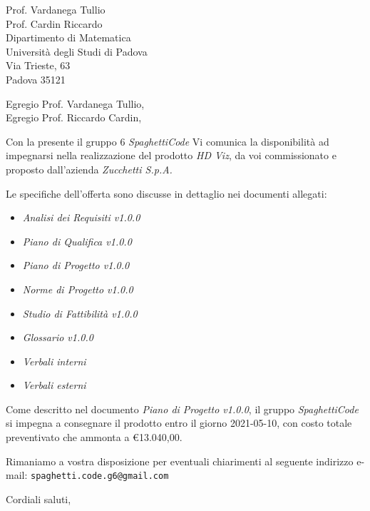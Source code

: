 \documentclass[a4paper,12pt]{letteracdp}
\date{18 gennaio 2021}
\begin{document}
\begin{letter}{
		\vspace*{-2\baselineskip}
		Prof. Vardanega Tullio \\
		Prof. Cardin Riccardo \\
		Dipartimento di Matematica \\
		Università degli Studi di Padova \\
		Via Trieste, 63 \\
		Padova 35121}

	\opening{Egregio Prof. Vardanega Tullio, \\
		\noindent Egregio Prof. Riccardo Cardin,}

	\begin{flushleft}
		Con la presente il gruppo 6 \textit{SpaghettiCode} Vi comunica la disponibilità ad impegnarsi nella realizzazione del prodotto \textit{HD Viz}, da voi commissionato e proposto dall'azienda \textit{Zucchetti S.p.A.}

		Le specifiche dell'offerta sono discusse in dettaglio nei documenti allegati:
	\end{flushleft}

	\begin{itemize}
		\item \emph{Analisi dei Requisiti v1.0.0}
		\item \emph{Piano di Qualifica v1.0.0}
		\item \emph{Piano di Progetto v1.0.0}
		\item \emph{Norme di Progetto v1.0.0}
		\item \emph{Studio di Fattibilità v1.0.0}
		\item \emph{Glossario v1.0.0}
		\item \emph{Verbali interni}
		\item \emph{Verbali esterni}
	\end{itemize}

	\begin{flushleft}
		Come descritto nel documento \emph{Piano di Progetto v1.0.0}, il gruppo \textit{SpaghettiCode} si impegna a consegnare il prodotto entro il giorno 2021-05-10, con costo totale preventivato che ammonta a \euro{13.040,00}.

		Rimaniamo a vostra disposizione per eventuali chiarimenti al seguente indirizzo e-mail: {\texttt{spaghetti.code.g6@gmail.com}}
	\end{flushleft}

	\closing{Cordiali saluti,}

\end{letter}
\end{document}
